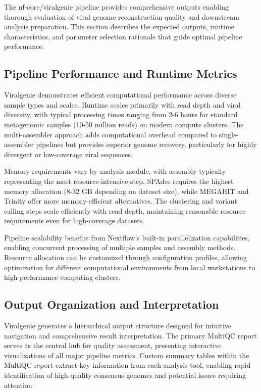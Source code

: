 \documentclass[unnumsec,webpdf,contemporary,large]{oup-authoring-template}%
\theoremstyle{thmstyleone}%
\theoremstyle{thmstyletwo}%
\theoremstyle{thmstylethree}%
\begin{document}
The nf-core/viralgenie pipeline provides comprehensive outputs enabling thorough evaluation of viral genome reconstruction quality and downstream analysis preparation. This section describes the expected outputs, runtime characteristics, and parameter selection rationale that guide optimal pipeline performance.

\subsection{Pipeline Performance and Runtime Metrics}\label{subsec_performance}

Viralgenie demonstrates efficient computational performance across diverse sample types and scales. Runtime scales primarily with read depth and viral diversity, with typical processing times ranging from 2-6 hours for standard metagenomic samples (10-50 million reads) on modern compute clusters. The multi-assembler approach adds computational overhead compared to single-assembler pipelines but provides superior genome recovery, particularly for highly divergent or low-coverage viral sequences.

Memory requirements vary by analysis module, with assembly typically representing the most resource-intensive step. SPAdes requires the highest memory allocation (8-32 GB depending on dataset size), while MEGAHIT and Trinity offer more memory-efficient alternatives. The clustering and variant calling steps scale efficiently with read depth, maintaining reasonable resource requirements even for high-coverage datasets.

Pipeline scalability benefits from Nextflow's built-in parallelization capabilities, enabling concurrent processing of multiple samples and assembly methods. Resource allocation can be customized through configuration profiles, allowing optimization for different computational environments from local workstations to high-performance computing clusters.

\subsection{Output Organization and Interpretation}\label{subsec_output}

Viralgenie generates a hierarchical output structure designed for intuitive navigation and comprehensive result interpretation. The primary MultiQC report serves as the central hub for quality assessment, presenting interactive visualizations of all major pipeline metrics. Custom summary tables within the MultiQC report extract key information from each analysis tool, enabling rapid identification of high-quality consensus genomes and potential issues requiring attention.
\end{document}

